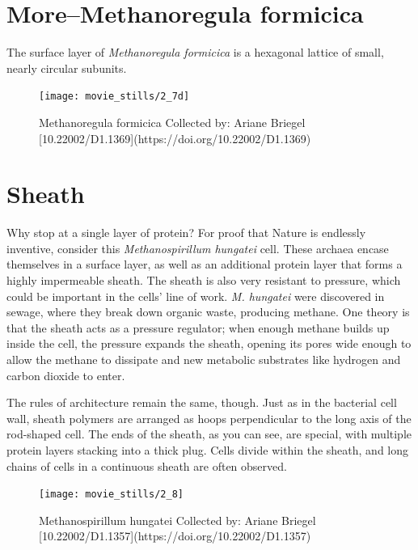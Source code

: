 \documentclass[]{tufte-book}
\begin{document}
\hypertarget{moremethanoregula-formicica}{\section{More--Methanoregula
formicica}\label{moremethanoregula-formicica}}

The surface layer of \emph{Methanoregula formicica} is a hexagonal
lattice of small, nearly circular subunits.

\begin{figure}
\texttt{[image: movie\_stills/2\_7d]} \caption[Methanoregula formicica Collected by]{Methanoregula formicica Collected by: Ariane Briegel [10.22002/D1.1369](https://doi.org/10.22002/D1.1369)}\label{fig:unnamed-chunk-41}
\end{figure}

\section{Sheath}\label{sheath}

Why stop at a single layer of protein? For proof that Nature is
endlessly inventive, consider this \emph{Methanospirillum hungatei}
cell. These archaea encase themselves in a surface layer, as well as an
additional protein layer that forms a highly impermeable sheath. The
sheath is also very resistant to pressure, which could be important in
the cells' line of work. \emph{M. hungatei} were discovered in sewage,
where they break down organic waste, producing methane. One theory is
that the sheath acts as a pressure regulator; when enough methane builds
up inside the cell, the pressure expands the sheath, opening its pores
wide enough to allow the methane to dissipate and new metabolic
substrates like hydrogen and carbon dioxide to enter.

The rules of architecture remain the same, though. Just as in the
bacterial cell wall, sheath polymers are arranged as hoops perpendicular
to the long axis of the rod-shaped cell. The ends of the sheath, as you
can see, are special, with multiple protein layers stacking into a thick
plug. Cells divide within the sheath, and long chains of cells in a
continuous sheath are often observed.

\begin{figure}
\texttt{[image: movie\_stills/2\_8]} \caption[Methanospirillum hungatei Collected by]{Methanospirillum hungatei Collected by: Ariane Briegel [10.22002/D1.1357](https://doi.org/10.22002/D1.1357)}\label{fig:unnamed-chunk-42}
\end{figure}
\end{document}
